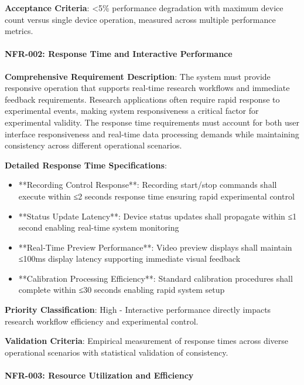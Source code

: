 \documentclass[12pt,a4paper]{article}
\begin{document}
\textbf{Acceptance Criteria}: <5\% performance degradation with maximum device count versus single device operation, measured
across multiple performance metrics.

\paragraph{NFR-002: Response Time and Interactive Performance}

\textbf{Comprehensive Requirement Description}: The system must provide responsive operation that supports real-time research
workflows and immediate feedback requirements. Research applications often require rapid response to experimental
events, making system responsiveness a critical factor for experimental validity. The response time requirements must
account for both user interface responsiveness and real-time data processing demands while maintaining consistency
across different operational scenarios.

\textbf{Detailed Response Time Specifications}:

\begin{itemize}
\item **Recording Control Response**: Recording start/stop commands shall execute within ≤2 seconds response time ensuring
  rapid experimental control
\item **Status Update Latency**: Device status updates shall propagate within ≤1 second enabling real-time system monitoring
\item **Real-Time Preview Performance**: Video preview displays shall maintain ≤100ms display latency supporting immediate
  visual feedback
\item **Calibration Processing Efficiency**: Standard calibration procedures shall complete within ≤30 seconds enabling
  rapid system setup

\end{itemize}
\textbf{Priority Classification}: High - Interactive performance directly impacts research workflow efficiency and
experimental control.

\textbf{Validation Criteria}: Empirical measurement of response times across diverse operational scenarios with statistical
validation of consistency.

\paragraph{NFR-003: Resource Utilization and Efficiency}
\end{document}
